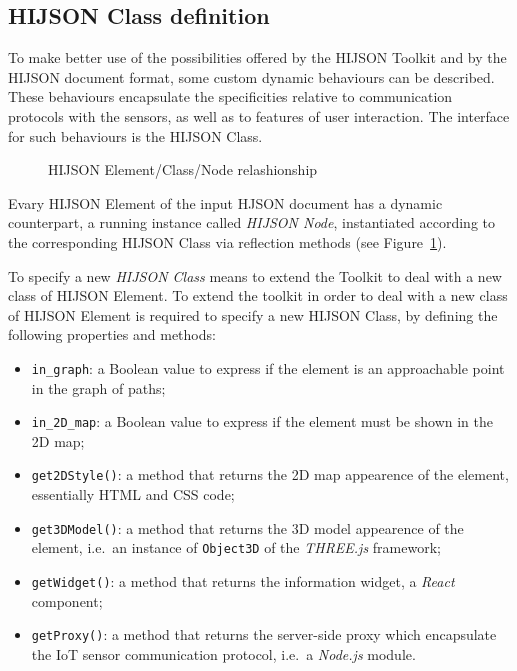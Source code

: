 \subsection{HIJSON Class definition}\label{hijson-class-definition}

To make better use of the possibilities offered by the HIJSON Toolkit and by the
HIJSON document format, some custom dynamic behaviours can be described. These
behaviours encapsulate the specificities relative to communication
protocols with the sensors, as well as to features of user interaction. The
interface for such behaviours is the HIJSON Class.

\begin{figure}[!h]
\centering
{}
\caption{HIJSON Element/Class/Node relashionship}
\label{fig:elem-class-node-rel}
\end{figure}

Evary HIJSON Element of the input HJSON document has a dynamic
counterpart, a running instance called \emph{HIJSON Node}, instantiated
according to the corresponding HIJSON Class via reflection methods (see
Figure~\ref{fig:elem-class-node-rel}).

To specify a new \emph{HIJSON Class} means to extend the Toolkit to deal with a
new class of HIJSON Element.
To extend the toolkit in order to deal with a new class of HIJSON Element is
required to specify a new HIJSON Class, by defining the following
properties and methods:

\begin{itemize}
\item
 \texttt{in\_graph}: a Boolean value to express if the element is an
 approachable point in the graph of paths;
\item
 \texttt{in\_2D\_map}: a Boolean value to express if the element must 
 be shown in the 2D map;
\item
 \texttt{get2DStyle()}: a method that returns the 2D map appearence of
 the element, essentially HTML and CSS code;
\item
 \texttt{get3DModel()}: a method that returns the 3D model appearence of
 the element, i.e.~an instance of \texttt{Obj\-ect\-3D} of the \emph{THREE.js} 
 framework;
\item
 \texttt{getWidget()}: a method that returns the information widget, a
 \emph{React} component;
\item
 \texttt{getProxy()}: a method that returns the server-side proxy which
 encapsulate the IoT sensor communication protocol, i.e.~a \emph{Node.js}
 module.
\end{itemize}

